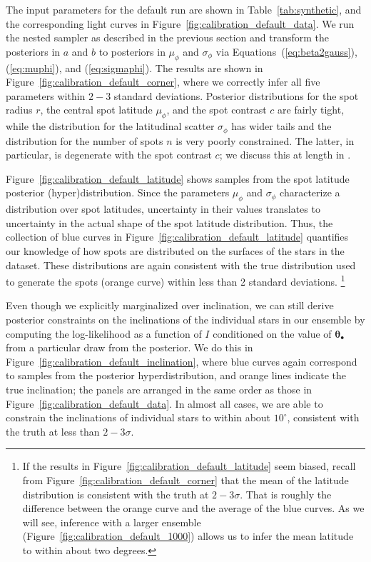 \documentclass[modern,linenumbers]{aastex62}
\begin{document}
The input parameters for the default run are shown in Table~\ref{tab:synthetic},
and the corresponding light curves in Figure~\ref{fig:calibration_default_data}.
We run the nested sampler as described in the previous section and transform
the posteriors in $a$ and $b$ to posteriors in $\mu_\phi$ and $\sigma_\phi$ via
Equations~(\ref{eq:beta2gauss}), (\ref{eq:muphi}), and (\ref{eq:sigmaphi}).
The results are shown in Figure~\ref{fig:calibration_default_corner}, where
we correctly infer all five parameters within $2-3$ standard deviations.
Posterior distributions for the spot radius $r$, the central spot latitude $\mu_\phi$,
and the spot contrast $c$ are fairly tight, while the distribution for
the latitudinal scatter $\sigma_\phi$ has wider tails and the distribution for
the number of spots $n$ is very poorly constrained. The latter, in particular, is
degenerate with the spot contrast $c$; we discuss this at length in
.

Figure~\ref{fig:calibration_default_latitude} shows samples from the spot
latitude posterior (hyper)distribution. Since the parameters $\mu_\phi$
and $\sigma_\phi$ characterize a distribution over spot latitudes, uncertainty
in their values translates to uncertainty in the actual shape of the spot
latitude distribution. Thus, the collection of blue curves in
Figure~\ref{fig:calibration_default_latitude} quantifies our knowledge of
how spots are distributed on the surfaces of the stars in the dataset.
These distributions are again consistent with the true distribution used
to generate the spots (orange curve) within less than 2 standard deviations.%
\footnote{%
    If the results in Figure~\ref{fig:calibration_default_latitude}
    seem biased, recall from Figure~\ref{fig:calibration_default_corner}
    that the mean of the latitude distribution is
    consistent with the truth at $2-3\sigma$. That is roughly the difference
    between the orange curve and the average of the blue curves. As we
    will see, inference with a larger ensemble
    (Figure~\ref{fig:calibration_default_1000})
    allows us to infer the mean latitude to within about two degrees.
}

Even though we explicitly marginalized over inclination, we can still
derive posterior constraints on the inclinations of the individual stars in
our ensemble by computing the log-likelihood as a function of $I$
conditioned on the value of $\pmb{\theta}_\bullet$ from a particular draw from
the posterior. We do this in Figure~\ref{fig:calibration_default_inclination},
where blue curves again correspond to samples from the posterior hyperdistribution,
and orange lines indicate the true inclination; the panels are arranged in the
same order as those in Figure~\ref{fig:calibration_default_data}.
In almost all cases, we are able to constrain the inclinations of individual
stars to within about $10^\circ$, consistent with the truth at less than
$2{-}3\sigma$.
\end{document}
